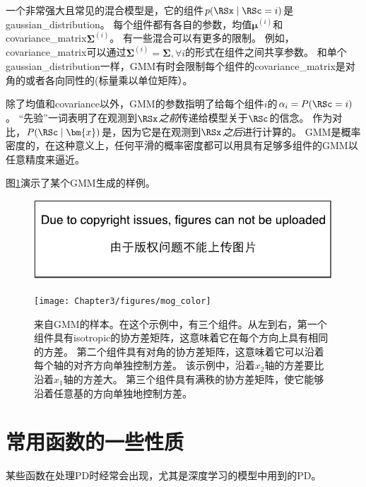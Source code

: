 一个非常强大且常见的混合模型是，它的组件$p(\RSx \mid \RSc= i)$是\gls{gaussian_distribution}。
每个组件都有各自的参数，均值$\bm{\mu}^{(i)}$和\gls{covariance_matrix}$\bm{\Sigma}^{(i)}$。
有一些混合可以有更多的限制。
例如，\gls{covariance_matrix}可以通过$\bm{\Sigma}^{(i)} = \bm{\Sigma}, \forall i$的形式在组件之间共享参数。
和单个\gls{gaussian_distribution}一样，\gls{GMM}有时会限制每个组件的\gls{covariance_matrix}是对角的或者各向同性的(标量乘以单位矩阵）。

除了均值和\gls{covariance}以外，\gls{GMM}的参数指明了给每个组件$i$的$\alpha_i = P(\RSc = i)$。
``先验''一词表明了在观测到$\RSx$\emph{之前}传递给模型关于$\RSc$的信念。
作为对比，$P(\RSc \mid \bm{x})$是，因为它是在观测到$\RSx$\emph{之后}进行计算的。
\gls{GMM}是概率密度的，在这种意义上，任何平滑的概率密度都可以用具有足够多组件的\gls{GMM}以任意精度来逼近。

图\ref{fig:chap3_mog_color}演示了某个\gls{GMM}生成的样例。
\begin{figure}[!htb]
\ifOpenSource
\centerline{\includegraphics{figure.pdf}}
\else
\centerline{\texttt{[image: Chapter3/figures/mog\_color]}}
\fi
\caption{来自\gls{GMM}的样本。在这个示例中，有三个组件。从左到右，第一个组件具有\gls{isotropic}的协方差矩阵，这意味着它在每个方向上具有相同的方差。 第二个组件具有对角的协方差矩阵，这意味着它可以沿着每个轴的对齐方向单独控制方差。
该示例中，沿着$x_2$轴的方差要比沿着$x_1$轴的方差大。 第三个组件具有满秩的协方差矩阵，使它能够沿着任意基的方向单独地控制方差。}
\label{fig:chap3_mog_color}
\end{figure}


\section{常用函数的一些性质}
\label{sec:useful_properties_of_common_functions}

某些函数在处理\gls{PD}时经常会出现，尤其是深度学习的模型中用到的\gls{PD}。


